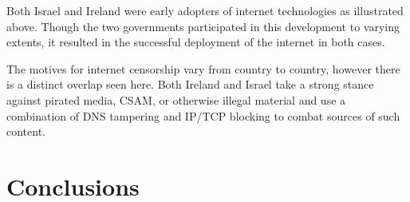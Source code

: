 Both Israel and Ireland were early adopters of internet technologies as illustrated above. Though the two governments participated in this development to varying extents, it resulted in the successful deployment of the internet in both cases. 

The motives for internet censorship vary from country to country, however there is a distinct overlap seen here. Both Ireland and Israel take a strong stance against pirated media, CSAM, or otherwise illegal material and use a combination of DNS tampering and IP/TCP blocking to combat sources of such content. 



\section{Conclusions}

